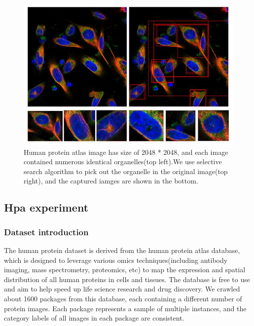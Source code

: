 \documentclass[10pt,twocolumn,letterpaper]{article}
\begin{document}
\begin{figure}[t]
\begin{center}
  \includegraphics[width=0.9\linewidth]{figure6.JPG}
\end{center}
  \caption{Human protein atlas image has size of 2048 * 2048, and each image contained numerous identical organelles(top left).We use selective search algorithm to pick out the organelle in the original image(top right), and the captured iamges are shown in the bottom.  }
\label{fig:long}
\label{fig:onecol}
\end{figure}


\subsection{Hpa experiment}

\subsubsection{Dataset introduction}
The human protein dataset is derived from the human protein atlas database, which is designed to leverage various omics techniques(including antibody imaging, mass spectrometry, proteomics, etc) to map the expression and spatial distribution of all human proteins in cells and tissues. The database is free to use and aim to help speed up life science research and drug discovery. We crawled about 1600 packages from this database, each containing a different number of protein images. Each package represents a sample of multiple instances, and the category labels of all images in each package are consistent.
\end{document}

